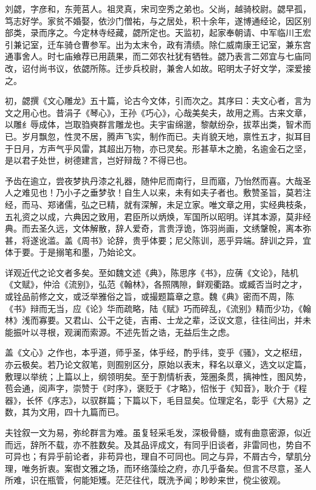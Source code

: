 \documentclass[12pt,UTF8]{ctexbook}
\begin{document}
刘勰，字彦和，东莞莒人。祖灵真，宋司空秀之弟也。父尚，越骑校尉。勰早孤，笃志好学。家贫不婚娶，依沙门僧祐，与之居处，积十余年，遂博通经论，因区别部类，录而序之。今定林寺经藏，勰所定也。天监初，起家奉朝请、中军临川王宏引兼记室，迁车骑仓曹参军。出为太末令，政有清绩。除仁威南康王记室，兼东宫通事舍人。时七庙飨荐已用蔬果，而二郊农社犹有牺牲。勰乃表言二郊宜与七庙同改，诏付尚书议，依勰所陈。迁步兵校尉，兼舍人如故。昭明太子好文学，深爱接之。

初，勰撰《文心雕龙》五十篇，论古今文体，引而次之。其序曰：夫文心者，言为文之用心也。昔涓子《琴心》，王孙《巧心》，心哉美矣夫，故用之焉。古来文章，以雕纟辱成体，岂取驺奭群言雕龙也。夫宇宙绵邈，黎献纷杂，拔萃出类，智术而已。岁月飘忽，性灵不居，腾声飞实，制作而已。夫肖貌天地，禀性五才，拟耳目于日月，方声气乎风雷，其超出万物，亦已灵矣。形甚草木之脆，名逾金石之坚，是以君子处世，树德建言，岂好辩哉？不得已也。

予齿在逾立，尝夜梦执丹漆之礼器，随仲尼而南行，旦而寤，乃怡然而喜。大哉圣人之难见也！乃小子之垂梦欤！自生人以来，未有如夫子者也。敷赞圣旨，莫若注经，而马、郑诸儒，弘之已精，就有深解，未足立家。唯文章之用，实经典枝条，五礼资之以成，六典因之致用，君臣所以炳焕，军国所以昭明。详其本源，莫非经典。而去圣久远，文体解散，辞人爱奇，言贵浮诡，饰羽尚画，文绣鞶帨，离本弥甚，将遂讹滥。盖《周书》论辞，贵乎体要；尼父陈训，恶乎异端。辞训之异，宜体于要。于是搦笔和墨，乃始论文。

详观近代之论文者多矣。至如魏文述《典》，陈思序《书》，应蒨《文论》，陆机《文赋》，仲洽《流别》，弘范《翰林》，各照隅隙，鲜观衢路。或臧否当时之才，或铨品前修之文，或泛举雅俗之旨，或撮题篇章之意。魏《典》密而不周，陈《书》辩而无当，应《论》华而疏略，陆《赋》巧而碎乱，《流别》精而少功，《翰林》浅而寡要。又君山、公干之徒，吉甫、士龙之辈，泛议文意，往往间出，并未能振叶以寻根，观澜而索源。不述先哲之诰，无益后生之虑。

盖《文心》之作也，本乎道，师乎圣，体乎经，酌乎纬，变乎《骚》，文之枢纽，亦云极矣。若乃论文叙笔，则囿别区分，原始以表末，释名以章义，选文以定篇，敷理以举统；上篇以上，纲领明矣。至于割情析表，笼圈条贯，摛神性，图风势，苞会通，阅声字，崇赞于《时序》，褒贬于《才略》，怊怅于《知音》，耿介于《程器》，长怀《序志》，以驭群篇；下篇以下，毛目显矣。位理定名，彰乎《大易》之数，其为文用，四十九篇而已。

夫铨叙一文为易，弥纶群言为难。虽复轻采毛发，深极骨髓，或有曲意密源，似近而远，辞所不载，亦不胜数矣。及其品评成文，有同乎旧谈者，非雷同也，势自不可异也；有异乎前论者，非苟异也，理自不可同也。同之与异，不屑古今，擘肌分理，唯务折衷。案辔文雅之场，而环络藻绘之府，亦几乎备矣。但言不尽意，圣人所难，识在瓶管，何能矩矱。茫茫往代，既洗予闻；眇眇来世，傥尘彼观。
\end{document}
